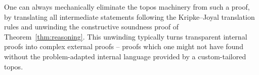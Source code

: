 \documentclass[oneside,reqno]{amsart}
\theoremstyle{definition}
\theoremstyle{plain}
\theoremstyle{remark}
\renewcommand{\_}{\mathpunct{.}\,}
\newcommand{\?}{\,{:}\,}
\begin{document}
One can always mechanically eliminate the topos machinery from such a proof, by
translating all intermediate statements following the Kripke--Joyal translation
rules and unwinding the constructive soundness proof of
Theorem~\ref{thm:reasoning}. This unwinding typically turns transparent
internal proofs into complex external proofs -- proofs which one might not have
found without the problem-adapted internal language provided by a
custom-tailored topos.



\printbibliography
\end{document}
